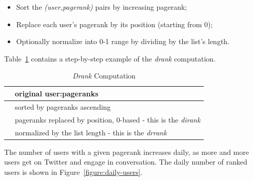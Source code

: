 \documentclass[10pt,oneside]{memoir}
\begin{document}
\begin{Spacing}{2}
\begin{itemize}


\item Sort the {\itshape (user,pagerank)} pairs by increasing pagerank;

\item Replace each user's pagerank by its position (starting from 0);

\item Optionally normalize into 0-1 range by dividing by the list's length.
\end{itemize}

Table~\ref{table:drank} contains a step-by-step example of the {\itshape drank} computation.



\begin{table}
    \caption{\emph{Drank} Computation}
    \label{table:drank}

    \centering

    \begin{tabular}{|c|p{2in}|}
    \hline
        [a:0.1 b:0.02 c:0.3 d:0.2] & original user:pageranks\\
    \hline
        [b:0.02 a:0.1 d:0.2 c:0.3] & sorted by pageranks ascending\\
    \hline
        [b:0 a:1 d:2 c:3] & pageranks replaced by position, 0-based - this is the \emph{dirank} \\
    \hline
        [b:0 a:1/4 d:2/4 c:3/4] & normalized by the list length - this is the \emph{drrank} \\
    \hline
    \end{tabular}
\end{table}
The number of users with a given pagerank increases daily, as more and more users get on Twitter and engage in conversation.  The daily number of ranked users is shown in Figure~\ref{figure:daily-users}.





\end{Spacing}
\end{document}
